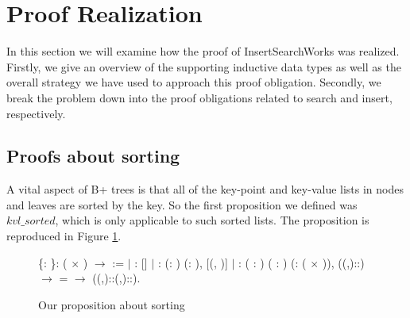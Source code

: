 \section{Proof Realization}
\label{sec:ProofRealization}
In this section we will examine how the proof of InsertSearchWorks was realized. Firstly, we give an overview of the supporting inductive data types as well as the overall strategy we have used to approach this proof obligation. Secondly, we break the problem down into the proof obligations related to search and insert, respectively. 

\subsection{Proofs about sorting}
A vital aspect of B+ trees is that all of the key-point and key-value lists in nodes and leaves are sorted by the key. So the first proposition we defined was $kvl\_sorted$, which is only applicable to such sorted lists. The proposition is reproduced in Figure \ref{fig:kvl_sorted}.

\begin{figure}
  \begin{coqdoccode}
  \coqdocnoindent
    \{: \}:  ( \ensuremath{\times} ) \ensuremath{\rightarrow}  :=\coqdoceol
  \coqdocindent{1.00em}
  \ensuremath{|}
  :  []\coqdoceol
  \coqdocindent{1.00em}
  \ensuremath{|} : \coqdockw{\ensuremath{\forall}} (: ) (: ), \coqdoceol
  \coqdocindent{8.00em}
   [(, )]\coqdoceol
  \coqdocindent{1.00em}
  \ensuremath{|} : \coqdockw{\ensuremath{\forall}} ( : ) ( : ) (:  ( \ensuremath{\times} )), \coqdoceol
  \coqdocindent{8.00em}
   ((,)::) \ensuremath{\rightarrow} \coqdoceol
  \coqdocindent{8.00em}
     =  \ensuremath{\rightarrow}\coqdoceol
  \coqdocindent{8.00em}
   ((,)::(,)::).\coqdoceol
  \end{coqdoccode}
  \caption{Our proposition about sorting}
  \label{fig:kvl_sorted}
\end{figure}


